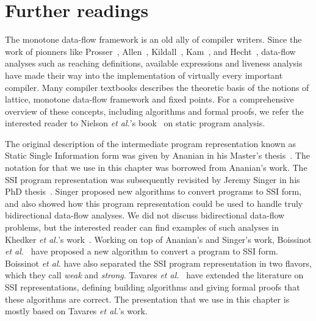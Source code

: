 {\section{Further readings}

The monotone data-flow framework is an old ally of compiler writers.
Since the work of pionners like Prosser~\cite{Prosser59}, Allen~\cite{Allen70,Allen76}, Kildall~\cite{kildall73}, Kam~\cite{Kam77}, and Hecht~\cite{Hecht77}, data-flow analyses such as reaching definitions, available expressions and liveness analysis have made their way into the implementation of virtually every important compiler.
Many compiler textbooks describes the theoretic basis of the notions of lattice, monotone data-flow framework and fixed points.
For a comprehensive overview of these concepts, including algorithms and formal proofs, we refer the interested reader to Nielson {\em et al.}'s book~\cite{Nielson05} on static program analysis.

The original description of the intermediate program representation known as Static Single Information form was given by Ananian in his Master's thesis~\cite{Ananian99}.
The notation for \sigmafuns that we use in this chapter was borrowed from Ananian's work.
The SSI program representation was subsequently revisited by Jeremy Singer in his PhD thesis~\cite{Singer06}.
Singer proposed new algorithms to convert programs to SSI form, and also showed how this program representation could be used to handle truly bidirectional data-flow analyses.
We did not discuss bidirectional data-flow problems, but the interested reader can find examples of such analyses in Khedker {\em et al.}'s work~\cite{Khedker99}.
Working on top of Ananian's and Singer's work, Boissinot {\em et al.}~\cite{BoissinotBDR12} have proposed a new algorithm to convert a program to SSI form.
Boissinot {\em et al.} have also separated the SSI program representation in two flavors, which they call {\em weak} and {\em strong}.
Tavares {\em et al.}~\cite{Tavares11b} have extended the literature on SSI representations, defining building algorithms and giving formal proofs that these algorithms are correct.
The presentation that we use in this chapter is mostly based on Tavares {\em et
al.}'s work.

}
